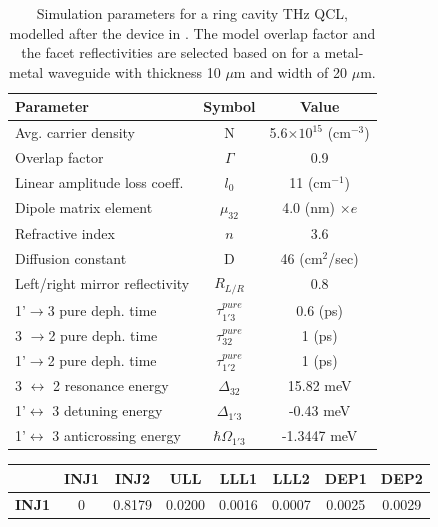 \documentclass[twocolumn,secnumarabic,amssymb, nobibnotes, aps, prd]{revtex4-1}
\begin{document}
{\begin{appendices}
				\begin{table}[H]
					\centering
					\footnotesize
					\begin{tabular}{ p{35 mm} c c}	
						\hline
						\textbf{Parameter}  & \textbf{Symbol} & \textbf{Value}\\
						\hline
						Avg. carrier density & N & 5.6$\times10^{15}$ (cm$^{-3}$)  \\
						Overlap factor & $\Gamma$ & 0.9 \\
						Linear amplitude loss coeff. & $l_0$ & 11 (cm$^{-1}$) \\
						Dipole matrix element &$\mu_{32}$& 4.0 (nm) $\times e$  \\
						Refractive index  & $n$ & 3.6 \\
						Diffusion constant & D & 46 (cm$^2$/sec)\\
						Left/right mirror reflectivity & $ R_{L/R} $ & 0.8 \\
						1'$\rightarrow$3 pure deph. time & $\tau_{1'3}^{pure}$ & 0.6 (ps)\\
						3 $\rightarrow$2 pure deph. time & $\tau_{32}^{pure}$ & 1 (ps)\\
						1'$\rightarrow$2 pure deph. time & $\tau_{1'2}^{pure}$ & 1 (ps)\\
						3 $\leftrightarrow$ 2 resonance energy & $ \Delta_{32}$ &  15.82 meV\\
						1'$\leftrightarrow$ 3 detuning energy & $\Delta_{1'3} $ &  -0.43 meV\\
						1'$\leftrightarrow$ 3 anticrossing energy & $\hbar\Omega_{1'3}$ &  -1.3447 meV\\
						\hline 
					\end{tabular}
					\caption[Table caption text]{ Simulation parameters for a ring cavity THz QCL, modelled after the device in \cite{burghoff2014terahertz}. The model overlap factor and the facet reflectivities are selected based on \cite{kohen2005electromagnetic} for a metal-metal waveguide with thickness 10 $\mu$m and width of 20 $\mu$m.}
					\label{tab:table01}
				\end{table}
				\begin{table}[H]
					\centering
					\footnotesize
					\begin{tabular}{ r | c c c c c c c}	
						\hline
						& \textbf{INJ1}  & 	\textbf{INJ2}& 	\textbf{ULL} & 	\textbf{LLL1} & 	\textbf{LLL2} & 	\textbf{DEP1} & 	\textbf{DEP2}\\
						\hline
						\textbf{INJ1}  & 0 &    0.8179 &    0.0200  &   0.0016   &  0.0007  &   0.0025 &    0.0029 \\

\end{tabular}
\end{table}
\end{appendices}}
\end{document}
